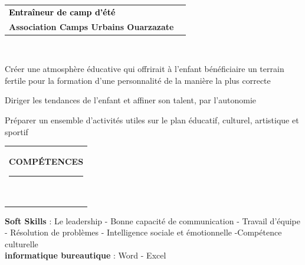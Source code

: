 \documentclass[10pt,A4]{article}
\newcommand{\mpwidth}{\linewidth-\fboxsep-\fboxsep}
\newcommand{\cvlist}[1] {
	\begin{itemize}{#1}\end{itemize}
}
\newcommand{\cvtext}[1] {
	\begin{tabular*}{1\mpwidth}{p{0.98\mpwidth}}
		\parbox{1\mpwidth}{#1}
	\end{tabular*}
}
\newcommand{\cvsection}[1] {
	\vspace{14pt}
	\cvtext{
		\textbf{\LARGE{\textcolor{darkcol}{\uppercase{#1}}}}\\[-4pt]
		\textcolor{maincol}{ \rule{0.1\textwidth}{2pt} } \\
	}
}
\newcommand{\cvevent}[7] {
	
	\parbox{\mpwidth}{
		\begin{tabular*}{\mpwidth}{p{0.72\mpwidth}  r}
	 		\textcolor{black}{\textbf{#2}} & \colorbox{maincol}{\makebox[0.25\mpwidth]{\textcolor{white}{#1}}} \\
			\textcolor{maincol}{\textbf{#3}} & \\
		\end{tabular*}\\

		\ifthenelse{\isempty{#4}}{}{
	\cvtext{#4}\\
}


	{#5}




	
	
	}



 
}
\begin{document}
\begin{paracol}{2}
\begin{rightcolumn}
\cvevent
{2015
}
{Entraîneur de camp d'été }
{Association Camps Urbains Ouarzazate}
{}
{}
{\cvlist{
		\item Creation of a web portal for role- and rights management
		\item Establishing a connection to the existing MicroFocus role solution
		\item Development of new role-based workfows and processes, as well as training and support
		\item Maintenance of existing infrastructure
}}
{\cvlist {
	\item Créer une atmosphère éducative qui offrirait à l'enfant bénéficiaire un terrain fertile pour la formation d'une personnalité de la manière la plus correcte
\item 	Diriger les tendances de l'enfant et affiner son talent, par l'autonomie	
\item T	Préparer un ensemble d'activités utiles sur le plan éducatif, culturel, artistique et sportif
}}
{\cvlist {
		\item Créer une atmosphère éducative qui offrirait à l'enfant bénéficiaire un terrain fertile pour la formation d'une personnalité de la manière la plus correcte
		\item 	Diriger les tendances de l'enfant et affiner son talent, par l'autonomie	
		\item Préparer un ensemble d'activités utiles sur le plan éducatif, culturel, artistique et sportif
}}


\vspace{7pt}
\cvsection{Compétences}


\textbf{Soft Skills} : Le leadership - Bonne capacité de communication - Travail d'équipe - Résolution de problèmes - 
Intelligence sociale et émotionnelle -Compétence culturelle
\\
\textbf{informatique bureautique} : Word - Excel 


\end{rightcolumn}
\end{paracol}
\end{document}
